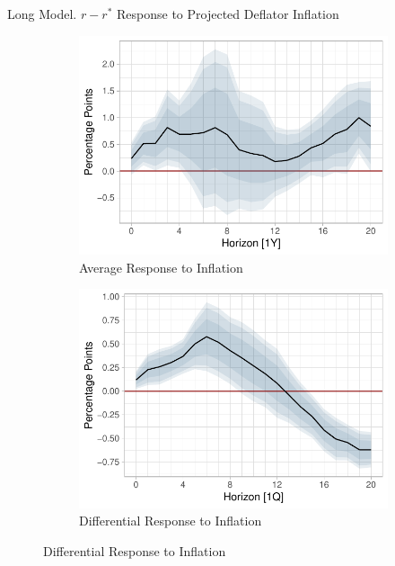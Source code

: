 \documentclass[10pt,aspectratio=169]{beamer}
\begin{document}
\begin{frame}{Long Model. $r-r^*$ Response to Projected Deflator Inflation}

    \begin{figure}[!htbp]\centering
        \caption{}
        \label{fig:LP2}
        \begin{subfigure}[b]{0.48\textwidth}
            \centering
            \caption{Average Response to Inflation}
            \label{fig:average_inflation}
            \includegraphics[width=\linewidth]{average_deflator_inflation_long.pdf}
        \end{subfigure}
        \hfill
        \begin{subfigure}[b]{0.48\textwidth}
            \centering 
            \caption{Differential Response to Inflation}
            \label{fig:differential_inflation}
            \includegraphics[width=\linewidth]{differential_deflator_inflation_long.pdf}

\end{subfigure}
\end{figure}
\end{frame}
\end{document}
